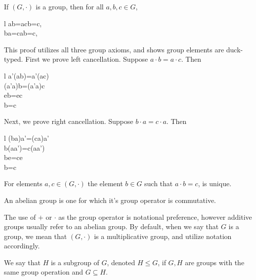 \documentclass{article}
\begin{document}
\begin{lem}
	\label{lrcancel}
	If \((G,\cdot)\) is a group, then for all \(a,b,c\in G\),
	\begin{IEEEeqnarray*}{l}
		a\cdot b=a\cdot c\Rightarrow b=c,\\
		b\cdot a=c\cdot a\Rightarrow b=c,\\
	\end{IEEEeqnarray*}
	\begin{IEEEproof}
		This proof utilizes all three group axioms, and shows group elements are duck-typed. First we prove left cancellation. Suppose \(a\cdot b=a\cdot c\). Then
		\begin{IEEEeqnarray*}{l}
			a'\cdot (a\cdot b)=a'\cdot (a\cdot c)\\
			(a'\cdot a)\cdot b=(a'\cdot a)\cdot c\\
			e\cdot b=e\cdot c\\
			b=c
		\end{IEEEeqnarray*}
		Next, we prove right cancellation. Suppose \(b\cdot a=c\cdot a\). Then
		\begin{IEEEeqnarray*}{l}
			(b\cdot a)\cdot a'=(c\cdot a)\cdot a'\\
			b\cdot(a\cdot a')=c\cdot(a\cdot a')\\
			b\cdot e=c\cdot e\\
			b=c
		\end{IEEEeqnarray*}
	\end{IEEEproof}
\end{lem}
\begin{cor}
	For elements \(a,c\in(G,\cdot)\) the element \(b\in G\) such that \(a\cdot b=c\), is unique.
\end{cor}
\begin{defi}[Abelian]
	An abelian group is one for which it's group operator is commutative.
\end{defi}
\begin{rema}
	The use of \(+\) or \(\cdot\) as the group operator is notational preference, however additive groups usually refer to an abelian group. By default, when we say that \(G\) is a group, we mean that \((G,\cdot)\) is a multiplicative group, and utilize notation accordingly.
\end{rema}
\begin{defi}[Subgroup]
	We say that \(H\) is a subgroup of \(G\), denoted \(H\leq G\), if \(G,H\) are groups with the same group operation and \(G\subseteq H\).
\end{defi}
\end{document}
